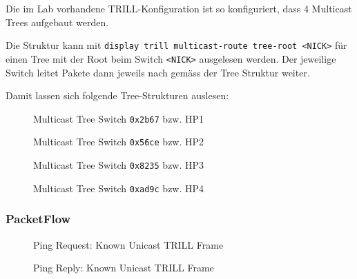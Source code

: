 Die im Lab vorhandene TRILL-Konfiguration ist so konfiguriert, dass 4 Multicast Trees aufgebaut werden.

Die Struktur kann mit \lstinline|display trill multicast-route tree-root <NICK>| für einen Tree mit der Root beim Switch \lstinline|<NICK>| ausgelesen werden. Der jeweilige Switch leitet Pakete dann jeweils nach gemäss der Tree Struktur weiter.

Damit lassen sich folgende Tree-Strukturen auslesen:
\begin{figure}[H]
\centering
\caption{Multicast Tree Switch \lstinline|0x2b67| bzw. HP1}
\label{fig:multicasttree0x2b67}
\end{figure}

\begin{figure}[H]
	\centering
	\caption{Multicast Tree Switch \lstinline|0x56ce| bzw. HP2}
	\label{fig:multicasttree0x56ce}
\end{figure}

\begin{figure}[H]
	\centering
	\caption{Multicast Tree Switch \lstinline|0x8235| bzw. HP3}
	\label{fig:multicasttree0x8235s}
\end{figure}

\begin{figure}[H]
	\centering
	\caption{Multicast Tree Switch \lstinline|0xad9c| bzw. HP4}
	\label{fig:multicasttree0xad9c}
\end{figure}



\subsubsection{PacketFlow}


\begin{figure}
	\centering
	\caption{Ping Request: Known Unicast TRILL Frame}
	\label{fig:trillpackage}
\end{figure}


\begin{figure}
	\centering
	\caption{Ping Reply: Known Unicast TRILL Frame}
	\label{fig:trillpackage}
\end{figure}

